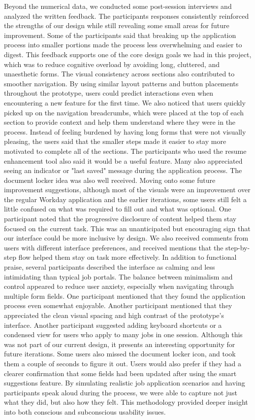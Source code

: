 \documentclass[
	letterpaper, %
]{jdf}
\begin{document}
\begin{sloppypar}
Beyond the numerical data, we conducted some post-session interviews and analyzed the written feedback. The participants responses consistently reinforced the strengths of our design while still revealing some small areas for future improvement. Some of the participants said that breaking up the application process into smaller portions made the process less overwhelming and easier to digest. This feedback supports one of the core design goals we had in this project, which was to reduce cognitive overload by avoiding long, cluttered, and unaesthetic forms. The visual consistency across sections also contributed to smoother navigation. By using similar layout patterns and button placements throughout the prototype, users could predict interactions even when encountering a new feature for the first time. We also noticed that users quickly picked up on the navigation breadcrumbs, which were placed at the top of each section to provide context and help them understand where they were in the process. Instead of feeling burdened by having long forms that were not visually pleasing, the users said that the smaller steps made it easier to stay more motivated to complete all of the sections. The participants who used the resume enhancement tool also said it would be a useful feature. Many also appreciated seeing an indicator or "last saved" message during the application process. The document locker idea was also well received. Moving onto some future improvement suggestions, although most of the visuals were an improvement over the regular Workday application and the earlier iterations, some users still felt a little confused on what was required to fill out and what was optional. One participant noted that the progressive disclosure of content helped them stay focused on the current task. This was an unanticipated but encouraging sign that our interface could be more inclusive by design. We also received comments from users with different interface preferences, and received mentions that the step-by-step flow helped them stay on task more effectively. In addition to functional praise, several participants described the interface as calming and less intimidating than typical job portals. The balance between minimalism and control appeared to reduce user anxiety, especially when navigating through multiple form fields. One participant mentioned that they found the application process even somewhat enjoyable. Another participant mentioned that they appreciated the clean visual spacing and high contrast of the prototype's interface. Another participant suggested adding keyboard shortcuts or a condensed view for users who apply to many jobs in one session. Although this was not part of our current design, it presents an interesting opportunity for future iterations.  Some users also missed the document locker icon, and took them a couple of seconds to figure it out. Users would also prefer if they had a clearer confirmation that some fields had been updated after using the smart suggestions feature. By simulating realistic job application scenarios and having participants speak aloud during the process, we were able to capture not just what they did, but also how they felt. This methodology provided deeper insight into both conscious and subconscious usability issues. 
\end{sloppypar}
\end{document}
